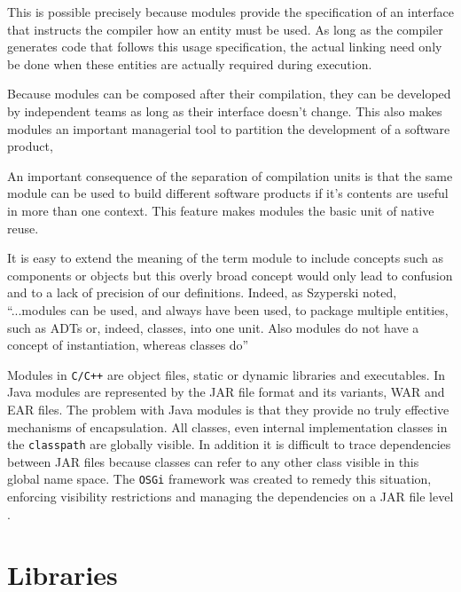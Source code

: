This is possible precisely because modules provide the specification of an interface that instructs the compiler how an entity must be used. As long
as the compiler generates code that follows this usage specification, the actual linking need only be done when these entities are actually required
during execution.

Because modules can be composed after their compilation, they can be developed by independent teams as long as their interface doesn't change.
This also makes modules an important managerial tool to partition the development of a software product,

An important consequence of the separation of compilation units is that the same module can be used to build different software products if it's
contents are useful in more than one context. This feature makes modules the basic unit of native reuse. 

It is easy to extend the meaning of the term module to include concepts such as components or objects but this overly broad concept
would only lead to confusion and to a lack of precision of our definitions. Indeed, as Szyperski noted, ``...modules can be used, and
always have been used, to package multiple entities, such as ADTs or, indeed, classes, into one unit. Also modules do not have a concept
of instantiation, whereas classes do''

Modules in \texttt{C/C++} are object files, static or dynamic libraries and executables. In Java modules are represented by the JAR file format and
its variants, WAR and EAR files. The problem with Java modules is that they provide no truly effective mechanisms of encapsulation. All classes, even
internal implementation classes in the \texttt{classpath} are globally visible. In addition it is difficult to trace dependencies between JAR files
because classes can refer to any other class visible in this global name space. The \texttt{OSGi} framework was created to remedy this situation,
enforcing visibility restrictions and managing the dependencies on a JAR file level \cite{Hall}.





\section{Libraries}
\label{sec:libraries}

